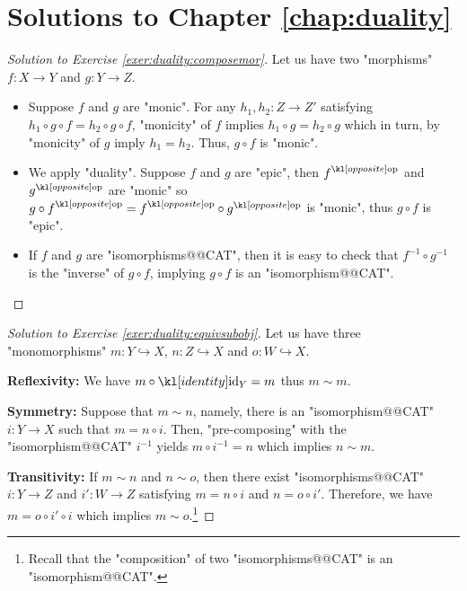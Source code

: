 \documentclass[main.tex]{subfiles}
\begin{document}
\section{Solutions to Chapter \ref{chap:duality}}
\begin{proof}[Solution to Exercise \ref{exer:duality:composemor}]\label{soln:duality:composemor}
    Let us have two "morphisms" $f: X \rightarrow Y$ and $g: Y \rightarrow Z$.
    \begin{itemize}
        \item Suppose $f$ and $g$ are "monic". For any $h_1,h_2: Z \rightarrow Z'$ satisfying $h_1 \circ g \circ f = h_2 \circ g \circ f$, "monicity" of $f$ implies $h_1 \circ g = h_2 \circ g$ which in turn, by "monicity" of $g$ imply $h_1 = h_2$. Thus, $g \circ f$ is "monic".
        \item We apply "duality". Suppose $f$ and $g$ are "epic", then $\op{f}$ and $\op{g}$ are "monic" so $\op{g\circ f} = \op{f} \circ \op{g}$ is "monic", thus $g \circ f$ is "epic".
        \item If $f$ and $g$ are "isomorphisms@@CAT", then it is easy to check that $f^{-1} \circ g^{-1}$ is the "inverse" of $g \circ f$, implying $g \circ f$ is an "isomorphism@@CAT".
    \end{itemize}
\end{proof}
\begin{proof}[Solution to Exercise \ref{exer:duality:equivsubobj}]\label{soln:duality:equivsubobj}
    Let us have three "monomorphisms" $m: Y \hookrightarrow X$, $n: Z \hookrightarrow X$ and $o: W \hookrightarrow X$.

    \textbf{Reflexivity:} We have $m \circ \id_Y = m$ thus $m \sim m$.

    \textbf{Symmetry:} Suppose that $m \sim n$, namely, there is an "isomorphism@@CAT" $i: Y \rightarrow X$ such that $m = n \circ i$. Then, "pre-composing" with the "isomorphism@@CAT" $i^{-1}$ yields $m \circ i^{-1} = n$ which implies $n \sim m$.

    \textbf{Transitivity:} If $m\sim n$ and $n\sim o$, then there exist "isomorphisms@@CAT" $i: Y \rightarrow Z$ and $i': W \rightarrow Z$ satisfying $m = n \circ i$ and $n = o \circ i'$. Therefore, we have $m =  o \circ i' \circ i$ which implies $m \sim o$.\footnote{Recall that the "composition" of two "isomorphisms@@CAT" is an "isomorphism@@CAT".}
\end{proof}
\end{document}
